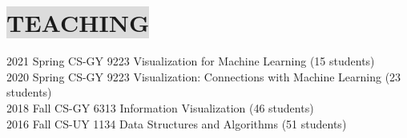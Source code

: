 \section*{
    \colorbox{gainsboro}{TEACHING}
}

2021 Spring \hspace{9mm} 
CS-GY 9223 Visualization for Machine Learning (15 students)
\\
2020 Spring \hspace{9mm} 
CS-GY 9223 Visualization: Connections with Machine Learning (23 students)
\\
2018 Fall \hspace{13.5mm} 
CS-GY 6313 Information Visualization (46 students)
\\
2016 Fall \hspace{13.5mm} 
CS-UY 1134 Data Structures and Algorithms (51 students)
